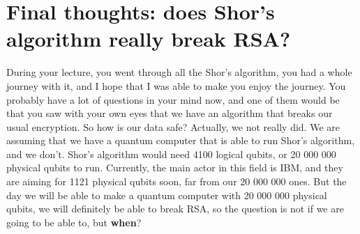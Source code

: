\section{Final thoughts: does Shor’s algorithm really break RSA?}
During your lecture, you went through all the Shor’s algorithm, you had a whole journey with it, and I hope that I was able to make you enjoy the journey. You probably have a lot of questions in your mind now, and one of them would be that you saw with your own eyes that we have an algorithm that breaks our usual encryption. So how is our data safe?\nl
Actually, we not really did. We are assuming that we have a quantum computer that is able to run Shor’s algorithm, and we don’t. Shor’s algorithm would need 4100 logical qubits, or 20 000 000 physical qubits to run.\nl
Currently, the main actor in this field is IBM, and they are aiming for 1121 physical qubits soon, far from our 20 000 000 ones. But the day we will be able to make a quantum computer with 20 000 000 physical qubits, we will definitely be able to break RSA, so the question is not if we are going to be able to, but \textbf{when}? 
